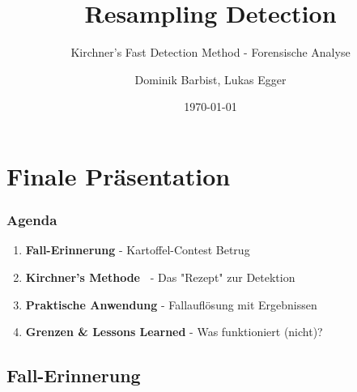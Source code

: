 \documentclass[11pt,t,usepdftitle=false,aspectratio=169]{beamer}
\title[Resampling Detection - Finale Präsentation]{Resampling Detection}
\subtitle{Kirchner's Fast Detection Method - Forensische Analyse}
\author[Dominik Barbist, Lukas Egger]{Dominik Barbist, Lukas Egger \\ \vspace{0.5em}}
\date{\today}
\begin{document}
\section{Finale Präsentation}

\begin{frame}
	\frametitle{Agenda}
	
	\vspace{1em}
	
	\begin{enumerate}
		\setlength{\itemsep}{0.5em}
		\item \textbf{Fall-Erinnerung} - Kartoffel-Contest Betrug
		\item \textbf{Kirchner's Methode~\cite{kirchner_fast_2008}} - Das "Rezept" zur Detektion
		\item \textbf{Praktische Anwendung} - Fallauflösung mit Ergebnissen
		\item \textbf{Grenzen \& Lessons Learned} - Was funktioniert (nicht)?
	\end{enumerate}
\end{frame}

\subsection{Fall-Erinnerung}
\end{document}
